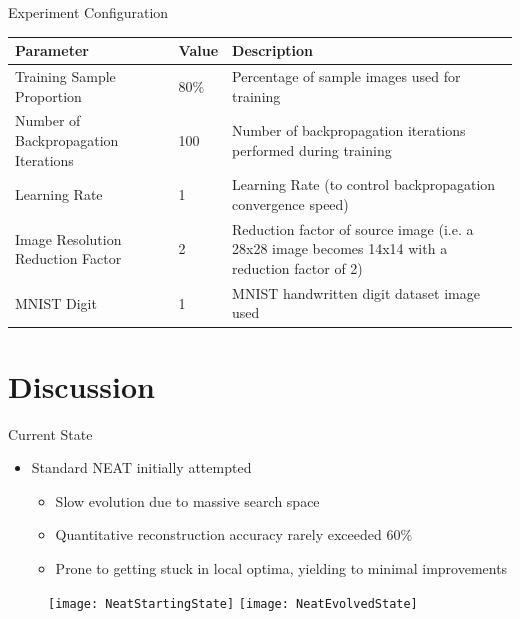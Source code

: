 \documentclass[xcolor=dvipsnames]{beamer}
\begin{document}
	\begin{frame}{Experiment Configuration}
		\begin{table}[b]
			\small
			\centering
			\begin{tabular}{|p{4cm}|p{0.8cm}|p{5cm}|}
				\hline\hline
				\textbf{Parameter} & \textbf{Value} & \textbf{Description} \\
		
				\hline
		
				Training Sample Proportion & 80\% & Percentage of sample images used for training \\
				\hline
				Number of Backpropagation Iterations & 100 & Number of backpropagation iterations performed during training \\
				\hline
				Learning Rate & 1 & Learning Rate (to control backpropagation convergence speed) \\
				\hline
				Image Resolution Reduction Factor & 2 & Reduction factor of source image (i.e. a 28x28 image becomes 14x14 with a reduction factor of 2) \\
				\hline
				MNIST Digit & 1 & MNIST handwritten digit dataset image used \\
		
				\hline
			\end{tabular}
		\end{table}
	\end{frame}
	
	\section{Discussion}
	\begin{frame}{Current State}
		\begin{itemize}
			\item Standard NEAT initially attempted
			\begin{itemize}
				\item Slow evolution due to massive search space
				\item Quantitative reconstruction accuracy rarely exceeded 60\%
				\item Prone to getting stuck in local optima, yielding to minimal improvements
			\end{itemize}			
		\end{itemize}
		\begin{figure}[h]
			\centering
			\texttt{[image: NeatStartingState]}
			\hfill
			\texttt{[image: NeatEvolvedState]}
		\end{figure}
	\end{frame}
	
\end{document}
